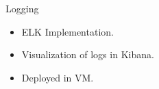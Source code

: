 \begin{frame}{Logging}
	\begin{itemize}
	\item ELK Implementation.
        \item Visualization of logs in  Kibana.
        \item Deployed in VM.
	\end{itemize}
\end{frame}